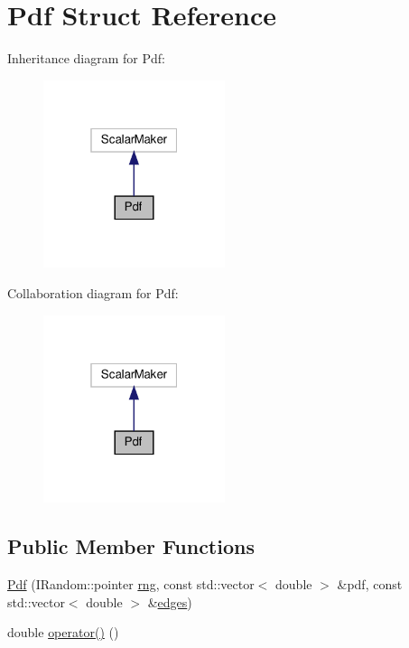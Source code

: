 \hypertarget{struct_pdf}{}\section{Pdf Struct Reference}
\label{struct_pdf}


Inheritance diagram for Pdf\+:
\nopagebreak
\begin{figure}[H]
\begin{center}
\leavevmode
\includegraphics[width=151pt]{struct_pdf__inherit__graph}
\end{center}
\end{figure}


Collaboration diagram for Pdf\+:
\nopagebreak
\begin{figure}[H]
\begin{center}
\leavevmode
\includegraphics[width=151pt]{struct_pdf__coll__graph}
\end{center}
\end{figure}
\subsection*{Public Member Functions}
\begin{DoxyCompactItemize}
\item 
\hyperlink{struct_pdf_a96006e28fb296b3d175fb4cf3cd8f50a}{Pdf} (I\+Random\+::pointer \hyperlink{struct_pdf_a7e63961db385abed7be8af1d991a001c}{rng}, const std\+::vector$<$ double $>$ \&pdf, const std\+::vector$<$ double $>$ \&\hyperlink{struct_pdf_a57275ab1190b2639e67f539c888412e5}{edges})
\item 
double \hyperlink{struct_pdf_a03ace21f984d07fe2823c57a2f59c3fe}{operator()} ()
\end{DoxyCompactItemize}
